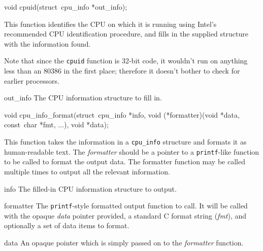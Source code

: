\label{cpuid}
\begin{apisyn}

	\funcproto void cpuid(\outparam struct~cpu_info *out_info);
\end{apisyn}
\begin{apidesc}
	This function identifies the CPU on which it is running
	using Intel's recommended CPU identification procedure,
	and fills in the supplied structure with the information found.

	Note that since the {\tt cpuid} function is 32-bit code,
	it wouldn't run on anything less than an 80386 in the first place;
	therefore it doesn't bother to check for earlier processors.
\end{apidesc}
\begin{apiparm}
	\item[out_info]
		The CPU information structure to fill in.
\end{apiparm}

\begin{apisyn}

	\funcproto void cpu_info_format(struct~cpu_info *info,
		        void (*formatter{)(void *data, const~char *fmt, ...)},
			void *data);
\end{apisyn}
\begin{apidesc}
	This function takes the information in a {\tt cpu_info} structure
	and formats it as human-readable text.
	The \emph{formatter} should be a pointer to a {\tt printf}-like function
	to be called to format the output data.
	The formatter function may be called multiple times
	to output all the relevant information.
\end{apidesc}
\begin{apiparm}
	\item[info]
		The filled-in CPU information structure to output.
	\item[formatter]
		The {\tt printf}-style formatted output function to call.
		It will be called with the opaque \emph{data} pointer provided,
		a standard C format string (\emph{fmt}),
		and optionally a set of data items to format.
	\item[data]
		An opaque pointer which is simply passed on
		to the \emph{formatter} function.
\end{apiparm}

